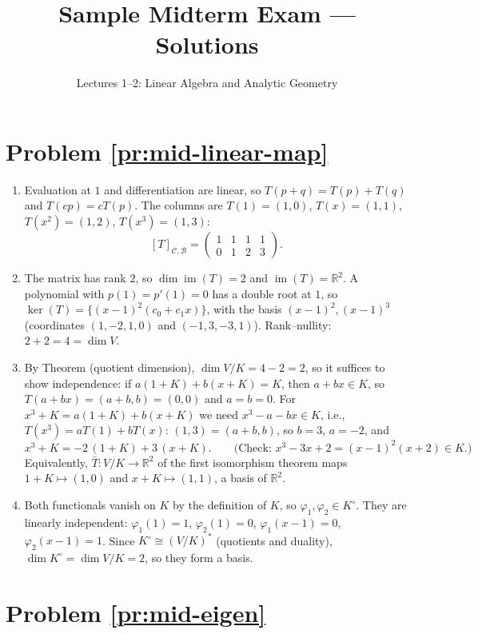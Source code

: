\documentclass[11pt]{article}
\title{Sample Midterm Exam --- Solutions}
\author{Lectures 1--2: Linear Algebra and Analytic Geometry}
\date{}
\DeclareMathOperator{\im}{im}
\begin{document}
\maketitle

\section*{Problem \ref{pr:mid-linear-map}}

\begin{enumerate}[label=(\alph*)]
    \item Evaluation at $1$ and differentiation are linear, so $T(p + q) = T(p) + T(q)$ and $T(cp) = cT(p)$. The columns are $T(1) = (1, 0)$, $T(x) = (1, 1)$, $T(x^2) = (1, 2)$, $T(x^3) = (1, 3)$:
    \[[T]_{\mathcal{C}, \mathcal{B}} = \begin{pmatrix} 1 & 1 & 1 & 1 \\ 0 & 1 & 2 & 3 \end{pmatrix}.\]
    \item The matrix has rank $2$, so $\dim \im(T) = 2$ and $\im(T) = \mathbb{R}^2$. A polynomial with $p(1) = p'(1) = 0$ has a double root at $1$, so $\ker(T) = \{(x - 1)^2(c_0 + c_1x)\}$, with the basis $(x - 1)^2, (x - 1)^3$ (coordinates $(1, -2, 1, 0)$ and $(-1, 3, -3, 1)$). Rank--nullity: $2 + 2 = 4 = \dim V$.
    \item By Theorem (quotient dimension), $\dim V/K = 4 - 2 = 2$, so it suffices to show independence: if $a(1 + K) + b(x + K) = K$, then $a + bx \in K$, so $T(a + bx) = (a + b, b) = (0, 0)$ and $a = b = 0$. For $x^3 + K = a(1 + K) + b(x + K)$ we need $x^3 - a - bx \in K$, i.e., $T(x^3) = aT(1) + bT(x)$: $(1, 3) = (a + b, b)$, so $b = 3$, $a = -2$, and
    \[x^3 + K = -2\,(1 + K) + 3\,(x + K). \qquad \text{(Check: } x^3 - 3x + 2 = (x - 1)^2(x + 2) \in K.)\]
    Equivalently, $\bar T: V/K \to \mathbb{R}^2$ of the first isomorphism theorem maps $1 + K \mapsto (1, 0)$ and $x + K \mapsto (1, 1)$, a basis of $\mathbb{R}^2$.
    \item Both functionals vanish on $K$ by the definition of $K$, so $\varphi_1, \varphi_2 \in K^\circ$. They are linearly independent: $\varphi_1(1) = 1$, $\varphi_2(1) = 0$, $\varphi_1(x - 1) = 0$, $\varphi_2(x - 1) = 1$. Since $K^\circ \cong (V/K)^*$ (quotients and duality), $\dim K^\circ = \dim V/K = 2$, so they form a basis.
\end{enumerate}

\section*{Problem \ref{pr:mid-eigen}}
\end{document}
